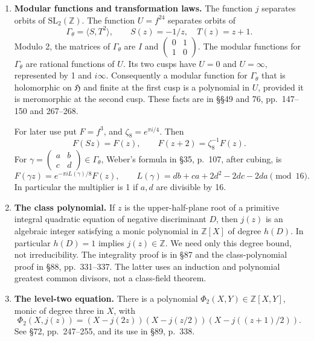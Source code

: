 \documentclass[11pt]{article}
\newcommand{\Z}{\mathbb Z}
\newcommand{\HH}{\mathfrak H}
\newcommand{\G}{\Gamma_\theta}
\begin{document}
\begin{enumerate}
\item \textbf{Modular functions and transformation laws.}
The function \(j\) separates orbits of
\(\mathrm{SL}_2(\Z)\). The function \(U=f^{24}\) separates orbits of
\[
 \G=\langle S,T^2\rangle,\qquad S(z)=-1/z,\quad T(z)=z+1.
\]
Modulo 2, the matrices of \(\G\) are \(I\) and
\(\left(\begin{smallmatrix}0&1\\1&0\end{smallmatrix}\right)\).
The modular functions for \(\G\) are rational functions of \(U\).
Its two cusps have \(U=0\) and \(U=\infty\), represented by 1 and
\(i\infty\). Consequently a modular function for \(\G\) that is
holomorphic on \(\HH\) and finite at the first cusp is a polynomial
in \(U\), provided it is meromorphic at the second cusp.
These facts are in \S\S49 and 76, pp.~147--150 and 267--268.

For later use put \(F=f^3\), and \(\zeta_8=e^{\pi i/4}\). Then
\begin{equation}\label{basic-transform}
 F(Sz)=F(z),\qquad F(z+2)=\zeta_8^{-1}F(z).
\end{equation}
For \(\gamma=\left(\begin{smallmatrix}a&b\\c&d\end{smallmatrix}\right)
\in\G\), Weber's formula in \S35, p.~107, after cubing, is
\begin{equation}\label{multiplier}
 F(\gamma z)=e^{-\pi i L(\gamma)/8}F(z),\qquad
 L(\gamma)=db+ca+2d^2-2dc-2da\pmod {16}.
\end{equation}
In particular the multiplier is 1 if \(a,d\) are divisible by 16.

\item \textbf{The class polynomial.}
If \(z\) is the upper-half-plane root of a primitive integral
quadratic equation of negative discriminant \(D\), then \(j(z)\)
is an algebraic integer satisfying a monic polynomial in \(\Z[X]\)
of degree \(h(D)\). In particular \(h(D)=1\) implies
\(j(z)\in\Z\). We need only this degree bound, not irreducibility.
The integrality proof is in \S87 and the class-polynomial proof in
\S88, pp.~331--337. The latter uses an induction and polynomial
greatest common divisors, not a class-field theorem.

\item \textbf{The level-two equation.}
There is a polynomial \(\Phi_2(X,Y)\in\Z[X,Y]\), monic of degree
three in \(X\), with
\begin{equation}\label{phi2}
 \Phi_2(X,j(z))=
 (X-j(2z))(X-j(z/2))(X-j((z+1)/2)).
\end{equation}
See \S72, pp.~247--255, and its use in \S89, p.~338.


\end{enumerate}
\end{document}

